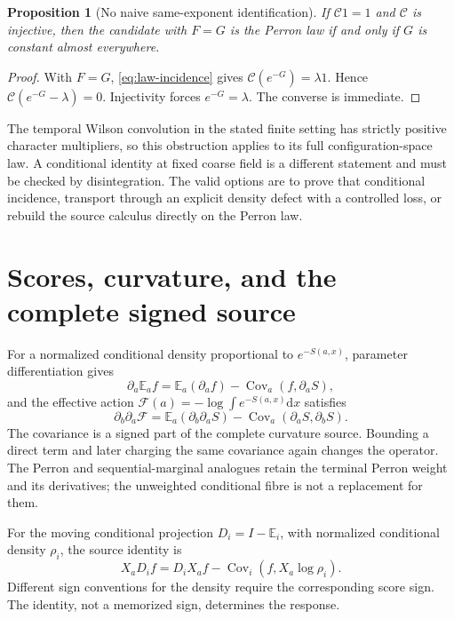 \documentclass[11pt,oneside,openany]{book}
\newtheorem{proposition}[proposition]{Proposition}
\theoremstyle{definition}
\theoremstyle{remark}
\newcommand{\E}{\mathbb E}
\newcommand{\dd}{\mathrm d}
\newcommand{\Cov}{\operatorname{Cov}}
\newcommand{\src}[2]{\cite[#2]{#1}}
\begin{document}
\begin{proposition}[No naive same-exponent identification]\label{prop:law-no-go}
If $\mathcal C1=1$ and $\mathcal C$ is injective, then the candidate with $F=G$ is the Perron law if and only if $G$ is constant almost everywhere.
\end{proposition}
\begin{proof}
With $F=G$, \cref{eq:law-incidence} gives $\mathcal C(e^{-G})=\lambda1$. Hence $\mathcal C(e^{-G}-\lambda)=0$. Injectivity forces $e^{-G}=\lambda$. The converse is immediate.
\end{proof}

The temporal Wilson convolution in the stated finite setting has strictly positive character multipliers, so this obstruction applies to its full configuration-space law. A conditional identity at fixed coarse field is a different statement and must be checked by disintegration. The valid options are to prove that conditional incidence, transport through an explicit density defect with a controlled loss, or rebuild the source calculus directly on the Perron law. \src{F1}{V21}

\section{Scores, curvature, and the complete signed source}
For a normalized conditional density proportional to $e^{-S(a,x)}$, parameter differentiation gives
\begin{equation}\label{eq:score}
\partial_a\E_a f=\E_a(\partial_af)-\Cov_a(f,\partial_aS),
\end{equation}
and the effective action $\mathcal F(a)=-\log\int e^{-S(a,x)}\dd x$ satisfies
\begin{equation}\label{eq:free-hess}
\partial_b\partial_a\mathcal F
=\E_a(\partial_b\partial_aS)-\Cov_a(\partial_aS,\partial_bS).
\end{equation}
The covariance is a signed part of the complete curvature source. Bounding a direct term and later charging the same covariance again changes the operator. The Perron and sequential-marginal analogues retain the terminal Perron weight and its derivatives; the unweighted conditional fibre is not a replacement for them.

For the moving conditional projection $D_i=I-\E_i$, with normalized conditional density $\rho_i$, the source identity is
\begin{equation}\label{eq:moving-score}
X_aD_if=D_iX_af-\Cov_i(f,X_a\log\rho_i).
\end{equation}
Different sign conventions for the density require the corresponding score sign. The identity, not a memorized sign, determines the response.
\end{document}

